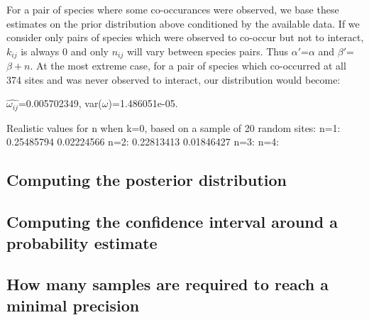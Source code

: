 \documentclass[12pt]{article}
\begin{document}
      For a pair of species where some co-occurances were observed, we base these estimates on the prior distribution above conditioned by the available data. If we consider only pairs of species which were observed to co-occur but not to interact, $k_{ij}$ is always 0 and only $n_{ij}$ will vary between species pairs. Thus $\alpha'$=$\alpha$ and $\beta'$=$\beta + n$. At the most extreme case, for a pair of species which co-occurred at all 374 sites and was never observed to interact, our distribution would become:

      $\hat{\omega_{ij}}$=0.005702349, var($\omega$)=1.486051e-05.
      

      Realistic values for n when k=0, based on a sample of 20 random sites:
      n=1: 0.25485794 0.02224566
      n=2: 0.22813413 0.01846427
      n=3:
      n=4:






    \subsection*{Computing the posterior distribution}

  \subsection*{Computing the confidence interval around a probability estimate}

    \subsection*{How many samples are required to reach a minimal precision}


\clearpage

     
\end{document}
